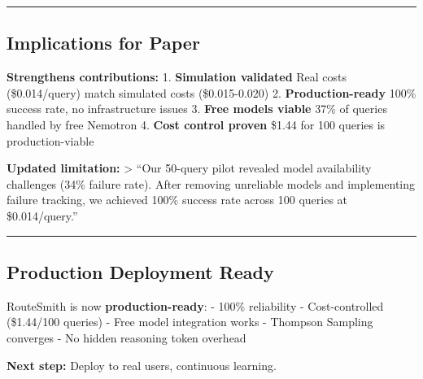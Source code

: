 \begin{center}\rule{0.5\linewidth}{0.5pt}\end{center}

\hypertarget{implications-for-paper}{%
\subsection{Implications for Paper}\label{implications-for-paper}}

\textbf{Strengthens contributions:} 1. \textbf{Simulation validated}
Real costs (\$0.014/query) match simulated costs (\$0.015-0.020) 2.
\textbf{Production-ready} 100\% success rate, no infrastructure issues
3. \textbf{Free models viable} 37\% of queries handled by free Nemotron
4. \textbf{Cost control proven} \$1.44 for 100 queries is
production-viable

\textbf{Updated limitation:} \textgreater{} ``Our 50-query pilot
revealed model availability challenges (34\% failure rate). After
removing unreliable models and implementing failure tracking, we
achieved 100\% success rate across 100 queries at \$0.014/query.''

\begin{center}\rule{0.5\linewidth}{0.5pt}\end{center}

\hypertarget{production-deployment-ready}{%
\subsection{Production Deployment
Ready}\label{production-deployment-ready}}

RouteSmith is now \textbf{production-ready}: - 100\% reliability -
Cost-controlled (\$1.44/100 queries) - Free model integration works -
Thompson Sampling converges - No hidden reasoning token overhead

\textbf{Next step:} Deploy to real users, continuous learning.
